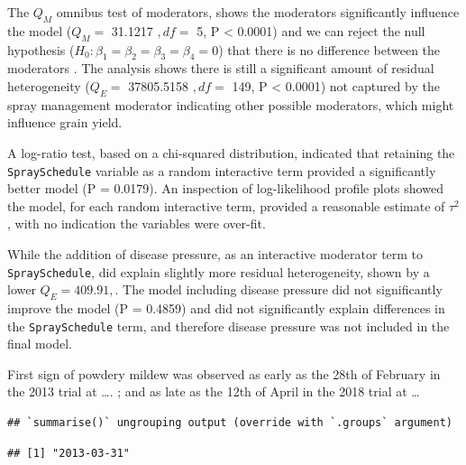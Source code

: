 \documentclass[agronomy,article,submit,moreauthors,pdftex]{mdpi}
\begin{document}
The \(Q_M\) omnibus test of moderators, shows the moderators significantly influence the model (\(Q_M =\) 31.1217 \(,df =\) 5, P \textless{} 0.0001) and we can reject the null hypothesis (\(H_0 : \beta_1 = \beta_2 = \beta_3 =\beta_4 = 0\)) that there is no difference between the moderators \citep{Viechtbauer2010}.
The analysis shows there is still a significant amount of residual heterogeneity (\(Q_E =\) 37805.5158 \(,df=\) 149, P \textless{} 0.0001) not captured by the spray management moderator indicating other possible moderators, which might influence grain yield.

A log-ratio test, based on a chi-squared distribution, indicated that retaining the \texttt{SpraySchedule} variable as a random interactive term provided a significantly better model (P = 0.0179).
An inspection of log-likelihood profile plots showed the model, for each random interactive term, provided a reasonable estimate of \(\tau^2\), with no indication the variables were over-fit.

While the addition of disease pressure, as an interactive moderator term to \texttt{SpraySchedule}, did explain slightly more residual heterogeneity, shown by a lower \(Q_E = 409.91,\).
The model including disease pressure did not significantly improve the model (P = 0.4859) and did not significantly explain differences in the \texttt{SpraySchedule} term, and therefore disease pressure was not included in the final model.

First sign of powdery mildew was observed as early as the 28th of February in the 2013 trial at \ldots. ; and as late as the 12th of April in the 2018 trial at \ldots{}

\begin{verbatim}
## `summarise()` ungrouping output (override with `.groups` argument)
\end{verbatim}

\begin{verbatim}
## [1] "2013-03-31"
\end{verbatim}
\end{document}
